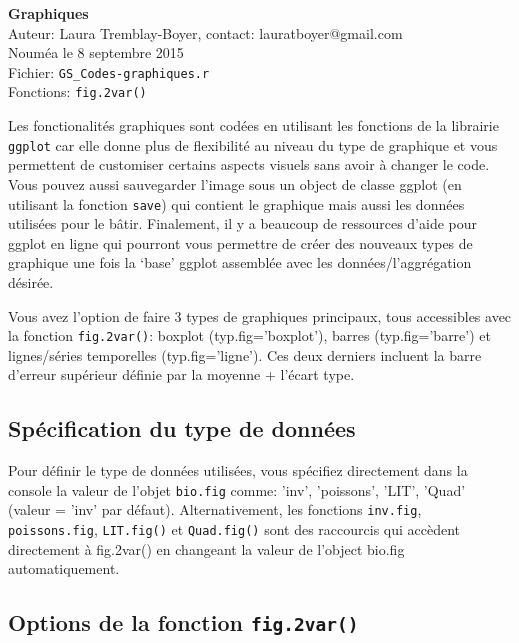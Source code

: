 \documentclass[12pt]{article}
\begin{document}
{\Large \textbf{Graphiques}}\\
Auteur: Laura Tremblay-Boyer, contact: lauratboyer@gmail.com\\
Nouméa le 8 septembre 2015\\



Fichier: \texttt{GS\_Codes-graphiques.r}\\
Fonctions: \texttt{fig.2var()}

Les fonctionalités graphiques sont codées en utilisant les fonctions de la librairie \texttt{ggplot} car elle donne plus de flexibilité au niveau du type de graphique et vous permettent de customiser certains aspects visuels sans avoir à changer le code. Vous pouvez aussi sauvegarder l'image sous un object de classe ggplot (en utilisant la fonction \texttt{save}) qui contient le graphique mais aussi les données utilisées pour le bâtir. Finalement, il y a beaucoup de ressources d'aide pour ggplot en ligne qui pourront vous permettre de créer des nouveaux types de graphique une fois la ‘base’ ggplot assemblée avec les données/l’aggrégation désirée.

Vous avez l'option de faire 3 types de graphiques principaux, tous accessibles avec la fonction \texttt{fig.2var()}: boxplot (typ.fig='boxplot'), barres (typ.fig='barre') et lignes/séries temporelles (typ.fig='ligne'). Ces deux derniers incluent la barre d'erreur supérieur définie par la moyenne + l'écart type.

\subsection{Spécification du type de données}
Pour définir le type de données utilisées, vous spécifiez directement dans la console la valeur de l'objet \texttt{bio.fig} comme: 'inv', 'poissons', 'LIT', 'Quad' (valeur = 'inv' par défaut). Alternativement, les fonctions \texttt{inv.fig}, \texttt{poissons.fig}, \texttt{LIT.fig()} et \texttt{Quad.fig()} sont des raccourcis qui accèdent directement à fig.2var() en changeant la valeur de l'object bio.fig automatiquement.

\subsection{Options de la fonction \texttt{fig.2var()}}
\end{document}
